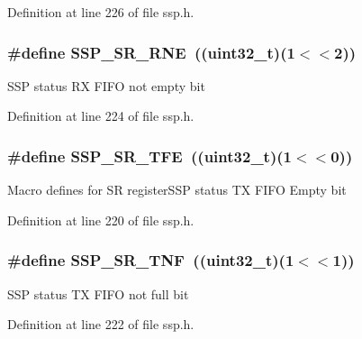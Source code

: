 Definition at line 226 of file ssp.\+h.

\subsubsection[{\texorpdfstring{S\+S\+P\+\_\+\+S\+R\+\_\+\+R\+NE}{SSP_SR_RNE}}]{\setlength{\rightskip}{0pt plus 5cm}\#define S\+S\+P\+\_\+\+S\+R\+\_\+\+R\+NE~(({\bf uint32\+\_\+t})(1$<$$<$2))}\hypertarget{group___s_s_p___private___macros_ga67740be98d73a50bf341ca3e2c25da6e}{}\label{group___s_s_p___private___macros_ga67740be98d73a50bf341ca3e2c25da6e}
S\+SP status RX F\+I\+FO not empty bit 

Definition at line 224 of file ssp.\+h.

\subsubsection[{\texorpdfstring{S\+S\+P\+\_\+\+S\+R\+\_\+\+T\+FE}{SSP_SR_TFE}}]{\setlength{\rightskip}{0pt plus 5cm}\#define S\+S\+P\+\_\+\+S\+R\+\_\+\+T\+FE~(({\bf uint32\+\_\+t})(1$<$$<$0))}\hypertarget{group___s_s_p___private___macros_gaa56cadbf2604cf3d9706f3583be99f63}{}\label{group___s_s_p___private___macros_gaa56cadbf2604cf3d9706f3583be99f63}
Macro defines for SR register\+S\+SP status TX F\+I\+FO Empty bit 

Definition at line 220 of file ssp.\+h.

\subsubsection[{\texorpdfstring{S\+S\+P\+\_\+\+S\+R\+\_\+\+T\+NF}{SSP_SR_TNF}}]{\setlength{\rightskip}{0pt plus 5cm}\#define S\+S\+P\+\_\+\+S\+R\+\_\+\+T\+NF~(({\bf uint32\+\_\+t})(1$<$$<$1))}\hypertarget{group___s_s_p___private___macros_gabde0199183f2a747cd039c66d40cf534}{}\label{group___s_s_p___private___macros_gabde0199183f2a747cd039c66d40cf534}
S\+SP status TX F\+I\+FO not full bit 

Definition at line 222 of file ssp.\+h.

